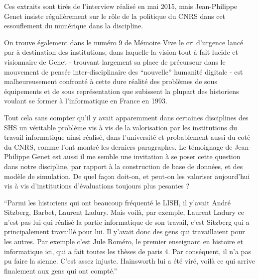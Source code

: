 Ces extraits sont tirés de l'interview réalisé en mai 2015, mais Jean-Philippe Genet insiste régulièrement sur le rôle de la politique du CNRS dans cet essouflement du numérique dans la discipline.

On trouve également dans le numéro 9 de Mémoire Vive le cri d'urgence lancé par \textcite{Genet1993} à destination des institutions, dans laquelle la vision tout à fait lucide et visionnaire de Genet - trouvant largement sa place de précurseur dans le mouvement de pensée inter-disciplinaire des \enquote{nouvelle} humanité digitale  - est malheureusement confronté à cette dure réalité des problèmes de sous équipements et de sous représentation que subissent la plupart des historiens voulant se former à l'informatique en France en 1993.

Tout cela sans compter qu'il y avait apparemment dans certaines disciplines des SHS un véritable problème vis à vis de la valorisation par les institutions du travail informatique ainsi réalisé, dans l'université et probablement aussi du coté du CNRS, comme l'ont montré les derniers paragraphes. Le témoignage de Jean-Philippe Genet est aussi il me semble une invitation à se poser cette question dans notre discipline, par rapport à la construction de base de données, et des modèle de simulation. De quel façon doit-on, et peut-on les valoriser aujourd'hui vis à vis d'institutions d'évaluations toujours plus pesantes ?

\enquote{Parmi les historiens qui ont beaucoup fréquenté le LISH, il y'avait André Sitzberg, Barbet, Laurent Ladury. Mais voilà, par exemple, Laurent Ladury ce n'est pas lui qui réalisé la partie informatique de son travail, c'est Sitzberg qui a principalement travaillé pour lui. Il y'avait donc des gens qui travaillaient pour les autres. Par exemple c'est Jule Roméro, le premier enseignant en histoire et informatique ici, qui a fait toutes les thèses de paris 4. Par conséquent, il n'a pas pu faire la sienne. C'est assez injuste. Hainsworth lui a été viré, voilà ce qui arrive finalement aux gens qui ont compté.}

